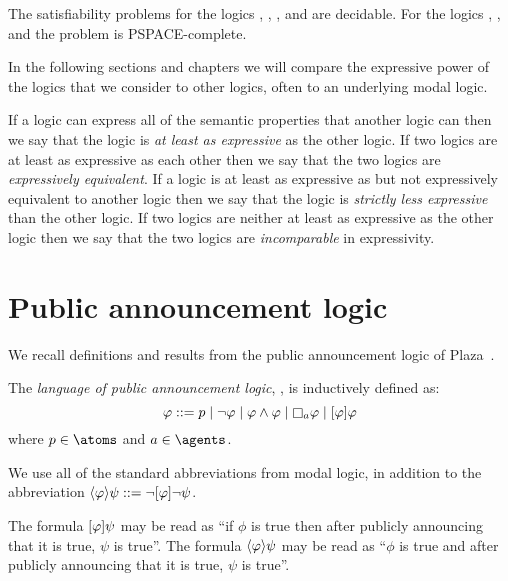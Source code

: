\begin{proposition}
The satisfiability problems for the logics \logicK{}, \logicKF{}, \logicKFF{}, \logicKD{} and \logicS{} are decidable.
For the logics \logicK{}, \logicKFF{}, \logicKD{} and \logicS{} the problem is PSPACE-complete. 
\end{proposition}


In the following sections and chapters we will compare the expressive power of the logics that we consider to other logics, often to an underlying modal logic.

\begin{definition}[Expressivity]
If a logic can express all of the semantic properties that another logic can then we say that the logic is {\em at least as expressive} as the other logic.
If two logics are at least as expressive as each other then we say that the two logics are {\em expressively equivalent}.
If a logic is at least as expressive as but not expressively equivalent to another logic then we say that the logic is {\em strictly less expressive} than the other logic.
If two logics are neither at least as expressive as the other logic then we say that the two logics are {\em incomparable} in expressivity.
\end{definition}

\section{Public announcement logic}\label{pal}

We recall definitions and results from the public announcement logic of Plaza~\cite{plaza:1989}.

\begin{definition}
The {\em language of public announcement logic}, \langPal{}, is inductively defined as:
$$
\phi ::= 
    \atomP \mid
    \lnot \phi \mid
    \phi \land \phi \mid
    \necessaryA \phi \mid
    \announceA{\phi} \phi
$$
where $\atomP \in \atoms$ and $\agentA \in \agents$.
\end{definition}

We use all of the standard abbreviations from modal logic, in addition to the abbreviation $\langle \varphi \rangle \psi ::= \lnot [ \varphi ] \lnot \psi$.

The formula $[ \varphi ] \psi$ may be read as ``if $\phi$ is true then after publicly announcing that it is true, $\psi$ is true''.
The formula $\langle \varphi \rangle \psi$ may be read as ``$\phi$ is true and after publicly announcing that it is true, $\psi$ is true''.

